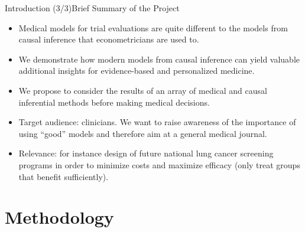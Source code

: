 \documentclass[11pt]{beamer}
\begin{document}
\begin{frame}{Introduction (3/3)}{Brief Summary of the Project}
	\begin{itemize}
	\item Medical models for trial evaluations are quite different to the models from causal inference that econometricians are used to.
	\item We demonstrate how modern models from causal inference can yield valuable additional insights for evidence-based and personalized medicine.
	\item We propose to consider the results of an array of medical and causal inferential methods before making medical decisions. 
	\item Target audience: clinicians. We want to raise awareness of the importance of using ``good'' models and therefore aim at a general medical journal.
	\item Relevance: for instance design of future national lung cancer screening programs in order to minimize costs and maximize efficacy (only treat groups that benefit sufficiently).
	\end{itemize}
\end{frame}


\section{Methodology}
\end{document}
